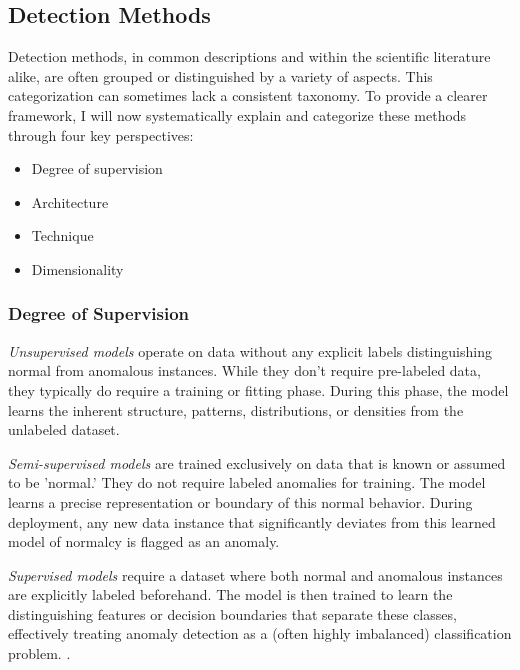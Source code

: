 \documentclass[12pt,oneside]{article}
\begin{document}
\subsection{Detection Methods}
Detection methods, in common descriptions and within the scientific literature alike, are often grouped or distinguished by a variety of aspects. This categorization can sometimes lack a consistent taxonomy. To provide a clearer framework, I will now systematically explain and categorize these methods through four key perspectives:
\begin{itemize}
    \item Degree of supervision
    \item Architecture
    \item Technique
    \item Dimensionality
\end{itemize}

\subsubsection{Degree of Supervision} \textit{Unsupervised models} operate on data without any explicit labels distinguishing normal from anomalous instances. While they don't require pre-labeled data, they typically do require a training or fitting phase. During this phase, the model learns the inherent structure, patterns, distributions, or densities from the unlabeled dataset.\par \textit{Semi-supervised models} are trained exclusively on data that is known or assumed to be 'normal.' They do not require labeled anomalies for training. The model learns a precise representation or boundary of this normal behavior. During deployment, any new data instance that significantly deviates from this learned model of normalcy is flagged as an anomaly. \par \textit{Supervised models} require a dataset where both normal and anomalous instances are explicitly labeled beforehand. The model is then trained to learn the distinguishing features or decision boundaries that separate these classes, effectively treating anomaly detection as a (often highly imbalanced) classification problem. \parencites[pp.~5-6]{boniol2024divetimeseriesanomalydetection}[p.~3]{liu2024elephant}[p.~3-4]{SchmidlEtAl2022Anomaly}.
\end{document}
